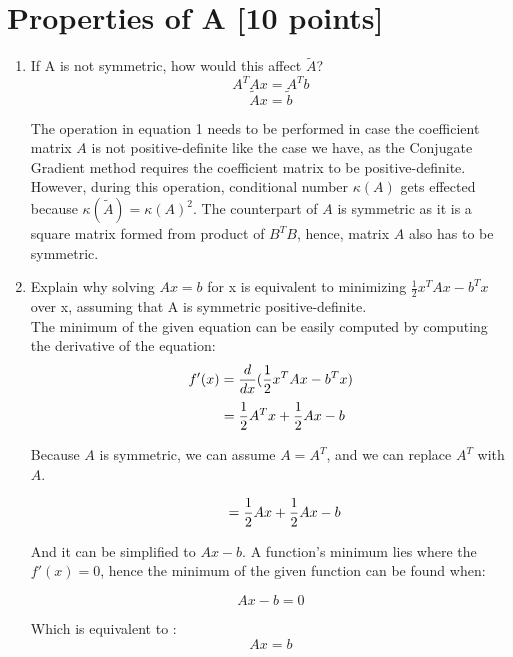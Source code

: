 \documentclass[unicode,11pt,a4paper,oneside,numbers=endperiod,openany]{scrartcl}
\begin{document}
\section{Properties of A [10 points]}

\begin{enumerate}
 \item If A is not symmetric, how would this affect ${\tilde{A}}$? \\
 
  \begin{equation}
  A^TAx = A^Tb
 \end{equation}
 \begin{equation}
  \tilde{A}x = \tilde{b}
 \end{equation}

The operation in equation 1 needs to be performed in case the coefficient matrix ${A}$ is not positive-definite like the case we have, as the Conjugate Gradient method requires the coefficient matrix to be positive-definite. However, during this operation, conditional number ${\kappa(A)}$ gets effected because ${\kappa (\tilde{A}) = {\kappa(A)}^2}$. The counterpart of ${A}$ is symmetric as it is a square matrix formed from product of ${B^TB}$, hence, matrix ${A}$ also has to be symmetric. \\

\newpage
\item Explain why solving ${Ax = b}$ for x is equivalent to minimizing ${\frac{1}{2}x^TAx - b^Tx}$ over x, assuming that A is symmetric positive-definite. \\

The minimum of the given equation can be easily computed by computing the derivative of the equation: \\

\begin{equation*}
f'(x) = \frac{d}{dx}(\frac{1}{2}x^TAx - b^Tx) \\
\end{equation*}
\begin{equation*}
\hspace*{20px}= \frac{1}{2}A^Tx + \frac{1}{2}Ax - b
\end{equation*}

Because ${A}$ is symmetric, we can assume ${A = A^T}$, and we can replace ${A^T}$ with ${A}$.

\begin{equation*}
\hspace*{20px}= \frac{1}{2}Ax + \frac{1}{2}Ax - b
\end{equation*}

And it can be simplified to ${Ax - b}$. A function's minimum lies where the ${f'(x) = 0}$, hence the minimum of the given function can be found when:

\begin{equation*}
 Ax - b = 0
\end{equation*}

Which is equivalent to :
\begin{equation*}
 Ax = b
\end{equation*}
\end{enumerate}
\end{document}
